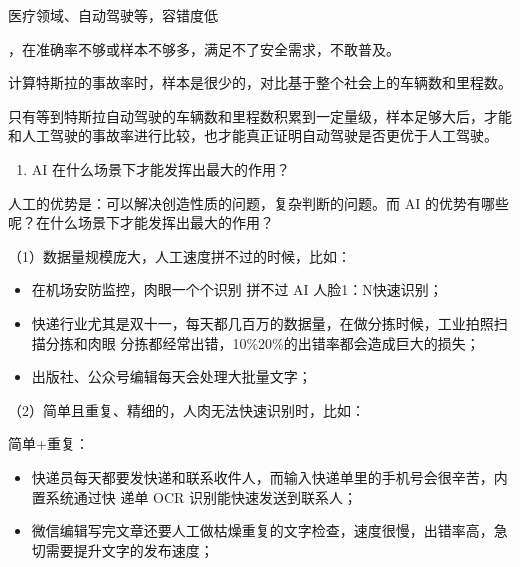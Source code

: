\documentclass[letterpaper,11pt,english]{sphinxmanual}
\begin{document}
医疗领域、自动驾驶等，容错度低%
\begin{footnote}[194]\sphinxAtStartFootnote
{}
%
\end{footnote}，在准确率不够或样本不够多，满足不了安全需求，不敢普及。

计算特斯拉的事故率时，样本是很少的，对比基于整个社会上的车辆数和里程数。

只有等到特斯拉自动驾驶的车辆数和里程数积累到一定量级，样本足够大后，才能和人工驾驶的事故率进行比较，也才能真正证明自动驾驶是否更优于人工驾驶。
\begin{enumerate}
%
\setcounter{enumi}{2}
\item {} 
AI
在什么场景下才能发挥出最大的作用？%
\begin{footnote}[195]\sphinxAtStartFootnote
{}
%
\end{footnote}

\end{enumerate}

人工的优势是：可以解决创造性质的问题，复杂判断的问题。而 AI
的优势有哪些呢？在什么场景下才能发挥出最大的作用？

（1）数据量规模庞大，人工速度拼不过的时候，比如：
\begin{itemize}
\item {} 
在机场安防监控，肉眼一个个识别 拼不过 AI 人脸1：N快速识别；

\item {} 
快递行业尤其是双十一，每天都几百万的数据量，在做分拣时候，工业拍照扫描分拣和肉眼\sphinxhyphen{}
分拣都经常出错，10\%\sphinxhyphen{}20\%的出错率都会造成巨大的损失；

\item {} 
出版社、公众号编辑每天会处理大批量文字；

\end{itemize}

（2）简单且重复、精细的，人肉无法快速识别时，比如：

简单+重复：
\begin{itemize}
\item {} 
快递员每天都要发快递和联系收件人，而输入快递单里的手机号会很辛苦，内置系统通过快\sphinxhyphen{}
递单 OCR 识别能快速发送到联系人；

\item {} 
微信编辑写完文章还要人工做枯燥重复的文字检查，速度很慢，出错率高，急切需要提升文字的发布速度；

\end{itemize}
\end{document}
